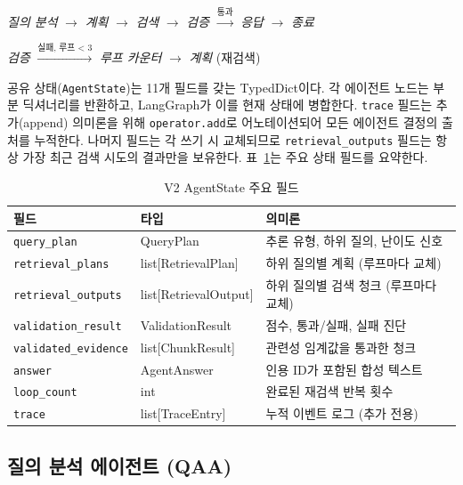\begin{center}
\textit{질의 분석} $\rightarrow$ \textit{계획} $\rightarrow$
\textit{검색} $\rightarrow$ \textit{검증}
$\xrightarrow{\text{통과}}$ \textit{응답} $\rightarrow$ \textit{종료}
\end{center}
\begin{center}
\textit{검증} $\xrightarrow{\text{실패, 루프 < 3}}$
\textit{루프 카운터} $\rightarrow$ \textit{계획} \quad (재검색)
\end{center}

공유 상태(\texttt{AgentState})는 11개 필드를 갖는 TypedDict이다. 각 에이전트 노드는 부분 딕셔너리를 반환하고, LangGraph가 이를 현재 상태에 병합한다. \texttt{trace} 필드는 추가(append) 의미론을 위해 \texttt{operator.add}로 어노테이션되어 모든 에이전트 결정의 출처를 누적한다. 나머지 필드는 각 쓰기 시 교체되므로 \texttt{retrieval\_outputs} 필드는 항상 가장 최근 검색 시도의 결과만을 보유한다. 표~\ref{tab:v2_state_ko}는 주요 상태 필드를 요약한다.

\begin{table}[H]
\centering
\caption{V2 AgentState 주요 필드}
\label{tab:v2_state_ko}
\begin{tabular}{lll}
\toprule
\textbf{필드} & \textbf{타입} & \textbf{의미론} \\
\midrule
\texttt{query\_plan}         & QueryPlan               & 추론 유형, 하위 질의, 난이도 신호 \\
\texttt{retrieval\_plans}    & list[RetrievalPlan]     & 하위 질의별 계획 (루프마다 교체) \\
\texttt{retrieval\_outputs}  & list[RetrievalOutput]   & 하위 질의별 검색 청크 (루프마다 교체) \\
\texttt{validation\_result}  & ValidationResult        & 점수, 통과/실패, 실패 진단 \\
\texttt{validated\_evidence} & list[ChunkResult]       & 관련성 임계값을 통과한 청크 \\
\texttt{answer}              & AgentAnswer             & 인용 ID가 포함된 합성 텍스트 \\
\texttt{loop\_count}         & int                     & 완료된 재검색 반복 횟수 \\
\texttt{trace}               & list[TraceEntry]        & 누적 이벤트 로그 (추가 전용) \\
\bottomrule
\end{tabular}
\end{table}

\subsection{질의 분석 에이전트 (QAA)}
\label{subsec:v2_qa_ko}

